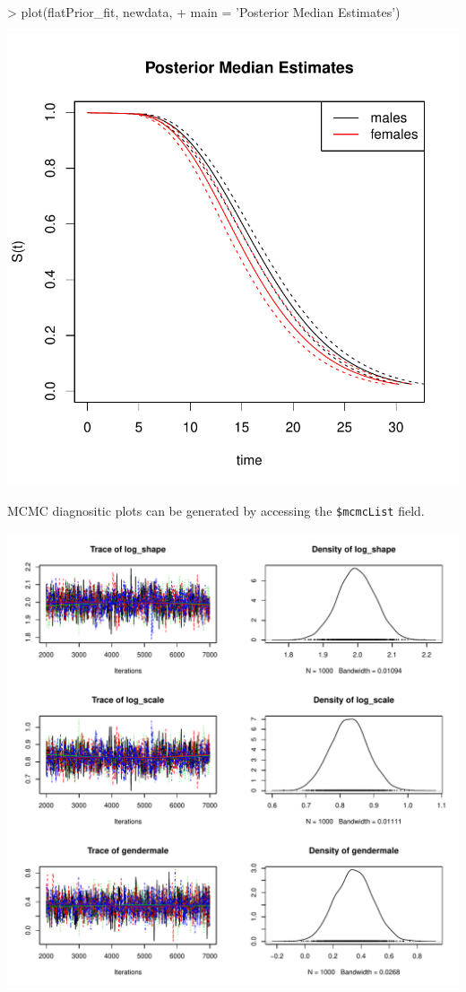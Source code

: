 \documentclass[a4paper]{article}
\begin{document}
\begin{Schunk}
\begin{Sinput}
>   plot(flatPrior_fit, newdata,
+        main = 'Posterior Median Estimates')
\end{Sinput}
\end{Schunk}
\includegraphics{icenReg-019}


MCMC diagnositic plots can be generated by accessing the \texttt{\$mcmcList} field. 

\begin{Schunk}
\end{Schunk}
\includegraphics{icenReg-020}
\end{document}
